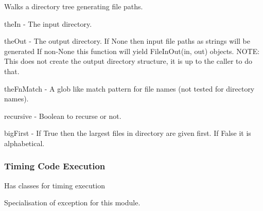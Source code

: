 \documentclass[letterpaper,10pt,english]{sphinxmanual}
\begin{document}
\begin{fulllineitems}
\label{\detokenize{ref/util/DirWalk:TotalDepth.util.DirWalk.dirWalk}}
Walks a directory tree generating file paths.

theIn - The input directory.

theOut - The output directory. If None then input file paths as strings
will be generated If non-None this function will yield
FileInOut(in, out) objects.
NOTE: This does not create the output directory structure, it is up to
the caller to do that.

theFnMatch - A glob like match pattern for file names (not tested for directory names).

recursive - Boolean to recurse or not.

bigFirst - If True then the largest files in  directory are given first. If False it is alphabetical.

\end{fulllineitems}



\subsubsection{Timing Code Execution}
\label{\detokenize{ref/util/ExecTimer:module-TotalDepth.util.ExecTimer}}\label{\detokenize{ref/util/ExecTimer::doc}}\label{\detokenize{ref/util/ExecTimer:timing-code-execution}}
Has classes for timing execution

\begin{fulllineitems}
\label{\detokenize{ref/util/ExecTimer:TotalDepth.util.ExecTimer.ExceptionExecTimer}}
Specialisation of exception for this module.

\end{fulllineitems}

\end{document}

